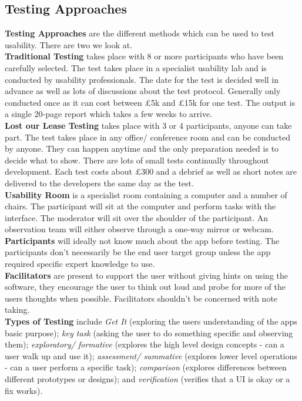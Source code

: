 \documentclass[a4paper,11pt]{article}
\begin{document}
\subsection{Testing Approaches}
\textbf{Testing Approaches} are the different methods which can be used to test usability. There are two we look at.\\
\textbf{Traditional Testing} takes place with 8 or more participants who have been carefully selected. The test takes place in a specialist usability lab and is conducted by usability professionals. The date for the test is decided well in advance as well as lots of discussions about the test protocol. Generally only conducted once as it can cost between £5k and £15k for one test. The output is a single 20-page report which takes a few weeks to arrive.\\
\textbf{Lost our Lease Testing} takes place with 3 or 4 participants, anyone can take part. The test takes place in any office/ conference room and can be conducted by anyone. They can happen anytime and the only preparation needed is to decide what to show. There are lots of small tests continually throughout development. Each test costs about £300 and a debrief as well as short notes are delivered to the developers the same day as the test.\\
\textbf{Usability Room} is a specialist room containing a computer and a number of chairs. The participant will sit at the computer and perform tasks with the interface. The moderator will sit over the shoulder of the participant. An observation team will either observe through a one-way mirror or webcam. \\
\textbf{Participants} will ideally not know much about the app before testing. The participants don't necessarily be the end user target group unless the app required specific expert knowledge to use.\\
\textbf{Facilitators} are present to support the user without giving hints on using the software, they encourage the user to think out loud and probe for more of the users thoughts when possible. Facilitators shouldn't be concerned with note taking. \\
\textbf{Types of Testing} include \textit{Get It} (exploring the users understanding of the apps basic purpose); \textit{key task} (asking the user to do something specific and observing them); \textit{exploratory/ formative} (explores the high level design concepts - can a user walk up and use it); \textit{assessment/ summative} (explores lower level operations - can a user perform a specific task); \textit{comparison} (explores differences between different prototypes or designs); and \textit{verification} (verifies that a UI is okay or a fix works). \\
\end{document}
